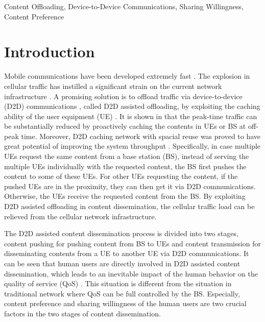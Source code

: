 \documentclass[12pt, draftclsnofoot, onecolumn]{IEEEtran}
\begin{document}
\begin{IEEEkeywords}
Content Offloading, Device-to-Device Communications, Sharing Willingness, Content Preference
\end{IEEEkeywords}

\newpage
\section{Introduction}

Mobile communications have been developed extremely fast \cite{Zhu2009,Zhu2012,zhu2012radio,zhu2011performance,wang2012distributed,pan2016pricing,pan2015totally}.
The explosion in cellular traffic has instilled a significant strain on the current network infrastructure \cite{index2015global}. A promising solution is to offload traffic via device-to-device (D2D) communications \cite{rebecchi2015data,chen2015energy}, called D2D assisted offloading, by exploiting the caching ability of the user equipment (UE) \cite{zhang2015buffer,7544526}.
It is shown in \cite{Bastug2014} that the peak-time traffic can be substantially reduced by proactively caching the contents in UEs or BS at off-peak time. Moreover, D2D caching network with spacial reuse was proved to have great potential of improving the system throughput \cite{MJi2016}.
Specifically, in case multiple UEs request the same content from a base station (BS), instead of serving the multiple UEs individually with the requested content, the BS first pushes the content to some of these UEs. For other UEs requesting the content, if the pushed UEs are in the proximity, they can then get it via D2D communications. Otherwise, the UEs receive the requested content from the BS. By exploiting D2D assisted offloading in content dissemination, the cellular traffic load can be relieved from the cellular network infrastructure\cite{sciancalepore2016offloading,jiang2016maximized}.

The D2D assisted content dissemination process is divided into two stages, content pushing for pushing content from BS to UEs and content transmission for disseminating contents from a UE to another UE via D2D communications. It can be seen that human users are directly involved in D2D assisted content dissemination, which leads to an inevitable impact of the human behavior on the quality of service (QoS) \cite{7435232,7509388,7539688}. This situation is different from the situation in traditional network where QoS can be full controlled by the BS. Especially, content preference and sharing willingness of the human users are two crucial factors in the two stages of content dissemination.
\end{document}
